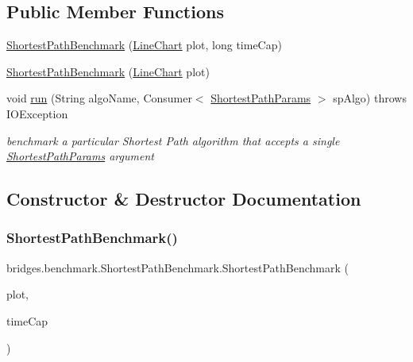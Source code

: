 \subsection*{Public Member Functions}
\begin{DoxyCompactItemize}
\item 
\hyperlink{classbridges_1_1benchmark_1_1_shortest_path_benchmark_ad878c2ad9c6912170601092423c54c43}{Shortest\+Path\+Benchmark} (\hyperlink{classbridges_1_1base_1_1_line_chart}{Line\+Chart} plot, long time\+Cap)
\item 
\hyperlink{classbridges_1_1benchmark_1_1_shortest_path_benchmark_ac84a2afc6e663b9d4edc61b3d4c4701c}{Shortest\+Path\+Benchmark} (\hyperlink{classbridges_1_1base_1_1_line_chart}{Line\+Chart} plot)
\item 
void \hyperlink{classbridges_1_1benchmark_1_1_shortest_path_benchmark_ad7e6918e142cfbdaac08493ccbf02acf}{run} (String algo\+Name, Consumer$<$ \hyperlink{classbridges_1_1benchmark_1_1_shortest_path_params}{Shortest\+Path\+Params} $>$ sp\+Algo)  throws I\+O\+Exception 
\begin{DoxyCompactList}\small\item\em benchmark a particular Shortest Path algorithm that accepts a single \hyperlink{classbridges_1_1benchmark_1_1_shortest_path_params}{Shortest\+Path\+Params} argument \end{DoxyCompactList}\end{DoxyCompactItemize}


\subsection{Constructor \& Destructor Documentation}
\mbox{\label{classbridges_1_1benchmark_1_1_shortest_path_benchmark_ad878c2ad9c6912170601092423c54c43}} 
\subsubsection{\texorpdfstring{Shortest\+Path\+Benchmark()}{ShortestPathBenchmark()}\hspace{0.1cm}{\footnotesize\ttfamily [1/2]}}
{\footnotesize\ttfamily bridges.\+benchmark.\+Shortest\+Path\+Benchmark.\+Shortest\+Path\+Benchmark (\begin{DoxyParamCaption}\item[{\hyperlink{classbridges_1_1base_1_1_line_chart}{Line\+Chart}}]{plot,  }\item[{long}]{time\+Cap }\end{DoxyParamCaption})}

